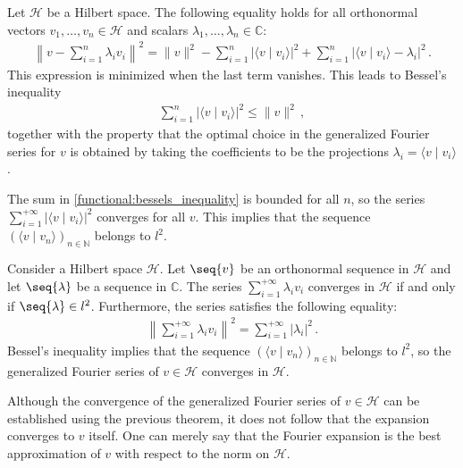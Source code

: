     \begin{property}
        Let $\mathcal{H}$ be a Hilbert space. The following equality holds for all orthonormal vectors $v_1,\ldots,v_n\in\mathcal{H}$ and scalars $\lambda_1,\ldots,\lambda_n\in\mathbb{C}$:
        \begin{gather}
            \left\|v - \sum_{i=1}^n\lambda_iv_i\right\|^2 = \|v\|^2 - \sum_{i=1}^n|\langle v\mid v_i \rangle|^2 + \sum_{i=1}^n|\langle v\mid v_i \rangle - \lambda_i|^2\,.
        \end{gather}
        This expression is minimized when the last term vanishes. This leads to Bessel's inequality
        \begin{gather}
            \label{functional:bessels_inequality}
            \sum_{i=1}^n|\langle v\mid v_i \rangle|^2\leq\|v\|^2\,,
        \end{gather}
        together with the property that the optimal choice in the generalized Fourier series for $v$ is obtained by taking the coefficients to be the projections $\lambda_i=\langle v\mid v_i \rangle$.
    \end{property}
    \begin{result}
        The sum in \cref{functional:bessels_inequality} is bounded for all $n$, so the series $\sum_{i=1}^{+\infty}|\langle v\mid v_i\rangle|^2$ converges for all $v$. This implies that the sequence $(\langle v\mid v_n\rangle)_{n\in\mathbb{N}}$ belongs to $l^2$.
    \end{result}

    \begin{theorem}
        Consider a Hilbert space $\mathcal{H}$. Let $\seq{v}$ be an orthonormal sequence in $\mathcal{H}$ and let $\seq{\lambda}$ be a sequence in $\mathbb{C}$. The series $\sum_{i=1}^{+\infty}\lambda_iv_i$ converges in $\mathcal{H}$ if and only if $\seq{\lambda}\in l^2$. Furthermore, the series satisfies the following equality:
        \begin{gather}
            \left\|\sum_{i=1}^{+\infty}\lambda_iv_i\right\|^2 = \sum_{i=1}^{+\infty}|\lambda_i|^2\,.
        \end{gather}
        Bessel's inequality implies that the sequence $(\langle v\mid v_n \rangle)_{n\in\mathbb{N}}$ belongs to $l^2$, so the generalized Fourier series of $v\in\mathcal{H}$ converges in $\mathcal{H}$.
    \end{theorem}
    \begin{remark}
        Although the convergence of the generalized Fourier series of $v\in\mathcal{H}$ can be established using the previous theorem, it does not follow that the expansion converges to $v$ itself. One can merely say that the Fourier expansion is the best approximation of $v$ with respect to the norm on $\mathcal{H}$.
    \end{remark}

